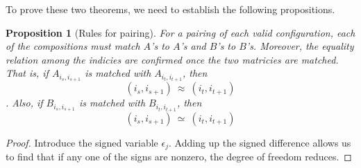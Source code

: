 \documentclass[12pt,reqno]{amsart}
\theoremstyle{plain} %
\newtheorem{prop}[theorem]{Proposition}
\theoremstyle{remark}
\theoremstyle{definition}
\begin{document}
To prove these two theorems, we need to establish 
the following propositions. 

\begin{prop} [Rules for pairing] \label{thm:pairingRule}
    For a pairing of each valid configuration, each of the compositions 
    must match $A$'s to $A$'s and $B$'s to $B$'s. Moreover, 
    the equality relation among the indicies are confirmed once the 
    two matricies are matched. That is, 
    if $A_{i_s, i_{s + 1}}$ is matched with 
    $A_{i_t, i_{t + 1}}$, then 
    \begin{equation}
        (i_s, i_{s + 1}) \ \approx \ (i_t, i_{t + 1})
    \end{equation}. Also, 
    if $B_{i_s, i_{s + 1}}$ is matched with 
    $B_{i_t, i_{t + 1}}$, then 
    \begin{equation}
        (i_s, i_{s + 1}) \ \simeq \  (i_t, i_{t + 1})
    \end{equation}
\end{prop}

\begin{proof}
    Introduce the signed variable $\epsilon_j$. Adding 
    up the signed difference allows us to find 
    that if any one of the signs are nonzero, the 
    degree of freedom reduces. 
\end{proof}
\end{document}
